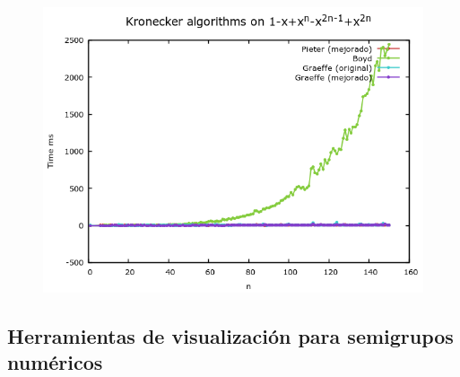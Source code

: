 \documentclass[10pt,compress]{beamer}
\begin{document}
  \begin{frame}
    \begin{figure}[H]
      \centering
      \includegraphics[width=\textwidth]{./images/fast_pedro.png}      
    \end{figure}
  \end{frame}

  \subsection{Herramientas de visualización para semigrupos numéricos}
\end{document}
